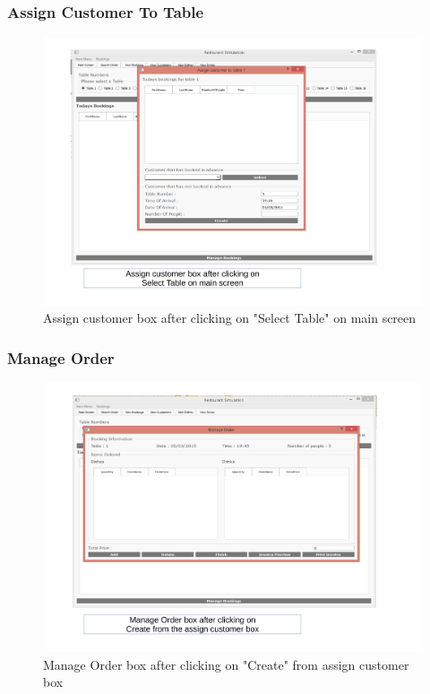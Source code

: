 \begin{landscape}
\subsubsection{Assign Customer To Table}
\begin{figure}[H]
    \includegraphics[width = 15cm]{./Maintenance/images/screen9}
    \caption{Assign customer box after clicking on "Select Table" on main screen} \label{fig:screen9}
\end{figure}

\subsubsection{Manage Order}
\begin{figure}[H]
    \includegraphics[width = 15cm]{./Maintenance/images/screen10}
    \caption{Manage Order box after clicking on "Create" from assign customer box} \label{fig:screen10}
\end{figure}


\end{landscape}
